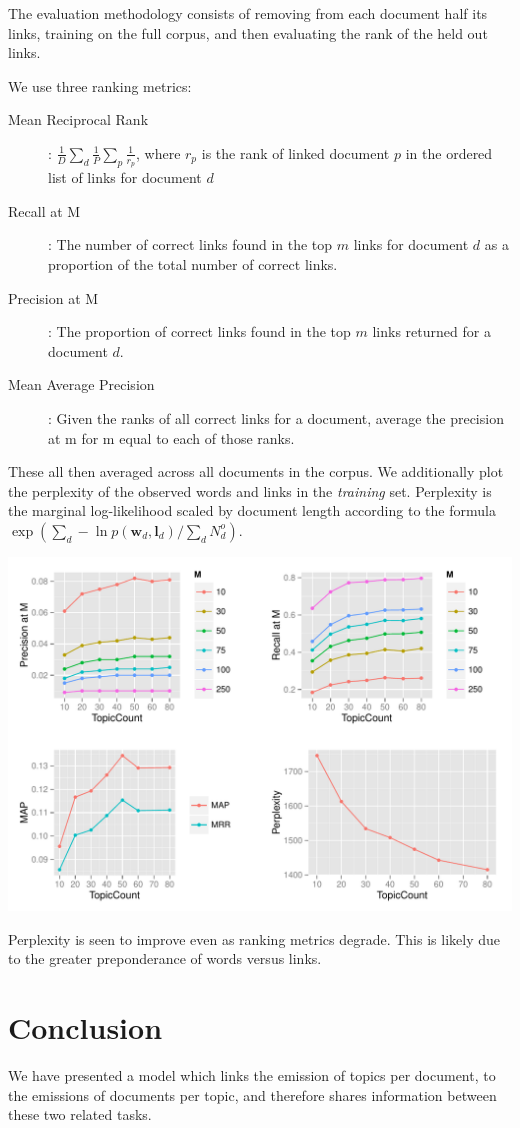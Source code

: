 \documentclass{sciposter}
\newcommand \vv[1] { \bm #1 }
\begin{document}
\begin{multicols}{3}
The evaluation methodology consists of removing from each document half its links, training on the full corpus, and then evaluating the rank of the held out links.

We use three ranking metrics:
\begin{description}
\item[Mean Reciprocal Rank]: $\frac{1}{D} \sum_d \frac{1}{P} \sum_p \frac{1}{r_p}$, where $r_p$ is the rank of linked document $p$ in the ordered list of links for document $d$ 
\item[Recall at M]: The number of correct links found in the top $m$ links for document $d$ as a proportion of the total number of correct links. 
\item[Precision at M]: The proportion of correct links found in the top $m$ links returned for a document $d$.
\item[Mean Average Precision]: Given the ranks of all correct links for a document, average the precision at m for m equal to each of those ranks. 
\end{description}
These all then averaged across all documents in the corpus. We additionally plot the perplexity of the observed words and links in the \emph{training} set. Perplexity is the marginal log-likelihood scaled by document length according to the formula $\exp\left(\sum_d -\ln p(\vv{w}_d,\vv{l}_d) / \sum_d N^o_d\right)$.

\includegraphics[scale=1.1]{images/RPlot.pdf}

Perplexity is seen to improve even as ranking metrics degrade. This is likely due to the greater preponderance of words versus links.

\section{Conclusion}
We have presented a model which links the emission of topics per document, to the emissions of documents per topic, and therefore shares information between these two related tasks. \\


\end{multicols}
\end{document}
